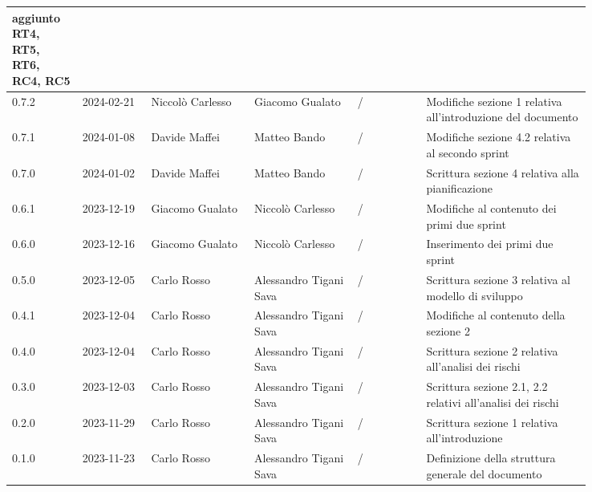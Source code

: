 {\begin{longtable}{p{0.10\linewidth}p{0.10\linewidth}p{0.15\linewidth}p{0.15\linewidth}p{0.10\linewidth}p{0.24\linewidth}}
	  aggiunto RT4, RT5, RT6, RC4, RC5                                                                                                                                           \\
	  \hline
	  0.7.2             & 2024-02-21    & Niccolò Carlesso   & Giacomo Gualato        & /                    & Modifiche sezione 1 relativa all'introduzione del documento       \\
	  \hline
	  0.7.1             & 2024-01-08    & Davide Maffei      & Matteo Bando           & /                    & Modifiche sezione 4.2 relativa al secondo sprint                  \\
	  \hline
	  0.7.0             & 2024-01-02    & Davide Maffei      & Matteo Bando           & /                    & Scrittura sezione 4 relativa alla pianificazione                  \\
	  \hline
	  0.6.1             & 2023-12-19    & Giacomo Gualato    & Niccolò Carlesso       & /                    & Modifiche al contenuto dei primi due sprint                       \\
	  \hline
	  0.6.0             & 2023-12-16    & Giacomo Gualato    & Niccolò Carlesso       & /                    & Inserimento dei primi due sprint                                  \\
	  \hline
	  0.5.0             & 2023-12-05    & Carlo Rosso        & Alessandro Tigani Sava & /                    & Scrittura sezione 3 relativa al modello di sviluppo               \\
	  \hline
	  0.4.1             & 2023-12-04    & Carlo Rosso        & Alessandro Tigani Sava & /                    & Modifiche al contenuto della sezione 2                            \\
	  \hline
	  0.4.0             & 2023-12-04    & Carlo Rosso        & Alessandro Tigani Sava & /                    & Scrittura sezione 2 relativa all'analisi dei rischi               \\
	  \hline
	  0.3.0             & 2023-12-03    & Carlo Rosso        & Alessandro Tigani Sava & /                    & Scrittura sezione 2.1, 2.2 relativi all'analisi dei rischi        \\
	  \hline
	  0.2.0             & 2023-11-29    & Carlo Rosso        & Alessandro Tigani Sava & /                    & Scrittura sezione 1 relativa all'introduzione                     \\
	  \hline
	  0.1.0             & 2023-11-23    & Carlo Rosso        & Alessandro Tigani Sava & /                    & Definizione della struttura generale del documento                \\
	  \bottomrule
  \end{longtable}
 }
